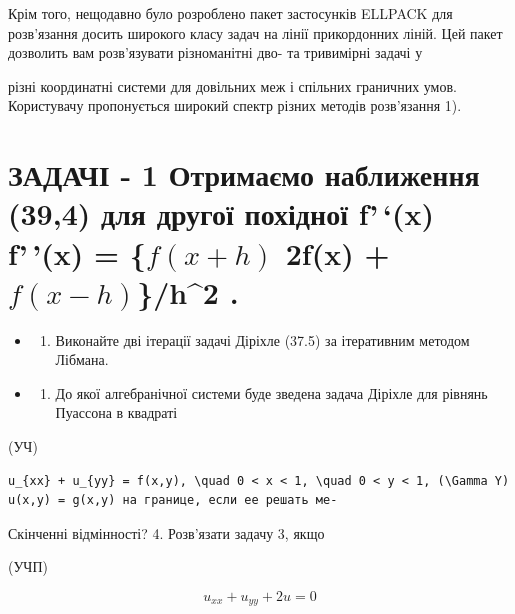 \documentclass[
  ukrainian,
]{article}
\providecommand{\tightlist}{%
  \setlength{\itemsep}{0pt}\setlength{\parskip}{0pt}}
\begin{document}
Крім того, нещодавно було розроблено пакет застосунків ELLPACK для
розв'язання досить широкого класу задач на лінії прикордонних ліній. Цей
пакет дозволить вам розв'язувати різноманітні дво- та тривимірні задачі
у

різні координатні системи для довільних меж і спільних граничних умов.
Користувачу пропонується широкий спектр різних методів розв'язання 1).

\section{\texorpdfstring{ЗАДАЧІ - 1 Отримаємо наближення (39,4) для
другої похідної f'\,`(x) f'\,'(x) = \{\(f(x+h)\) 2f(x) +
\(f(x-h)\)\}/h\^{}2
.}{ЗАДАЧІ - 1 Отримаємо наближення (39,4) для другої похідної f'\,`(x) f'\,'(x) = \{f(x+h) 2f(x) + f(x-h)\}/h\^{}2 .}}\label{ux437ux430ux434ux430ux447ux456---1-ux43eux442ux440ux438ux43cux430ux454ux43cux43e-ux43dux430ux431ux43bux438ux436ux435ux43dux43dux44f-394-ux434ux43bux44f-ux434ux440ux443ux433ux43eux457-ux43fux43eux445ux456ux434ux43dux43eux457-fx-fx-fxh-2fx-fx-hh2-.}

\begin{itemize}
\tightlist
\item
  \begin{enumerate}
  \def\labelenumi{\arabic{enumi}.}
  \setcounter{enumi}{1}
  \tightlist
  \item
    Виконайте дві ітерації задачі Діріхле (37.5) за ітеративним методом
    Лібмана.
  \end{enumerate}
\item
  \begin{enumerate}
  \def\labelenumi{\arabic{enumi}.}
  \setcounter{enumi}{2}
  \tightlist
  \item
    До якої алгебранічної системи буде зведена задача Діріхле для
    рівнянь Пуассона в квадраті
  \end{enumerate}
\end{itemize}

(УЧ\Pi)

\begin{verbatim}
u_{xx} + u_{yy} = f(x,y), \quad 0 < x < 1, \quad 0 < y < 1, (\Gamma Y) u(x,y) = g(x,y) на границе, если ее решать ме-
\end{verbatim}

Скінченні відмінності? 4. Розв'язати задачу 3, якщо

(УЧП)

\[
u_{xx} + u_{yy} + 2u = 0
\]
\end{document}

